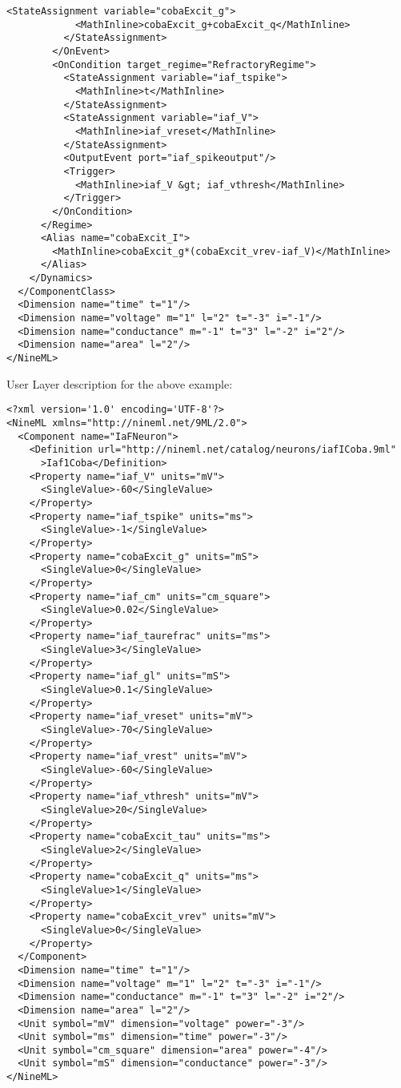 \documentclass[draftspec]{ninemlspec}
\begin{document}
\begin{lstlisting}[label=code:xmliaf2]
          <StateAssignment variable="cobaExcit_g">
            <MathInline>cobaExcit_g+cobaExcit_q</MathInline>
          </StateAssignment>
        </OnEvent>
        <OnCondition target_regime="RefractoryRegime">
          <StateAssignment variable="iaf_tspike">
            <MathInline>t</MathInline>
          </StateAssignment>
          <StateAssignment variable="iaf_V">
            <MathInline>iaf_vreset</MathInline>
          </StateAssignment>
          <OutputEvent port="iaf_spikeoutput"/>
          <Trigger>
            <MathInline>iaf_V &gt; iaf_vthresh</MathInline>
          </Trigger>
        </OnCondition>
      </Regime>
      <Alias name="cobaExcit_I">
        <MathInline>cobaExcit_g*(cobaExcit_vrev-iaf_V)</MathInline>
      </Alias>
    </Dynamics>
  </ComponentClass>
  <Dimension name="time" t="1"/>
  <Dimension name="voltage" m="1" l="2" t="-3" i="-1"/>
  <Dimension name="conductance" m="-1" t="3" l="-2" i="2"/>
  <Dimension name="area" l="2"/>
</NineML>
\end{lstlisting}

User Layer description for the above example:
\begin{lstlisting}
<?xml version='1.0' encoding='UTF-8'?>
<NineML xmlns="http://nineml.net/9ML/2.0">
  <Component name="IaFNeuron">
    <Definition url="http://nineml.net/catalog/neurons/iafICoba.9ml"
      >Iaf1Coba</Definition>
    <Property name="iaf_V" units="mV">
      <SingleValue>-60</SingleValue>
    </Property>
    <Property name="iaf_tspike" units="ms">
      <SingleValue>-1</SingleValue>
    </Property>
    <Property name="cobaExcit_g" units="mS">
      <SingleValue>0</SingleValue>
    </Property>
    <Property name="iaf_cm" units="cm_square">
      <SingleValue>0.02</SingleValue>
    </Property>
    <Property name="iaf_taurefrac" units="ms">
      <SingleValue>3</SingleValue>
    </Property>
    <Property name="iaf_gl" units="mS">
      <SingleValue>0.1</SingleValue>
    </Property>
    <Property name="iaf_vreset" units="mV">
      <SingleValue>-70</SingleValue>
    </Property>
    <Property name="iaf_vrest" units="mV">
      <SingleValue>-60</SingleValue>
    </Property>
    <Property name="iaf_vthresh" units="mV">
      <SingleValue>20</SingleValue>
    </Property>
    <Property name="cobaExcit_tau" units="ms">
      <SingleValue>2</SingleValue>
    </Property>
    <Property name="cobaExcit_q" units="ms">
      <SingleValue>1</SingleValue>
    </Property>
    <Property name="cobaExcit_vrev" units="mV">
      <SingleValue>0</SingleValue>
    </Property>
  </Component>
  <Dimension name="time" t="1"/>
  <Dimension name="voltage" m="1" l="2" t="-3" i="-1"/>
  <Dimension name="conductance" m="-1" t="3" l="-2" i="2"/>
  <Dimension name="area" l="2"/>
  <Unit symbol="mV" dimension="voltage" power="-3"/>
  <Unit symbol="ms" dimension="time" power="-3"/>
  <Unit symbol="cm_square" dimension="area" power="-4"/>
  <Unit symbol="mS" dimension="conductance" power="-3"/>
</NineML>
\end{lstlisting}
\end{document}
